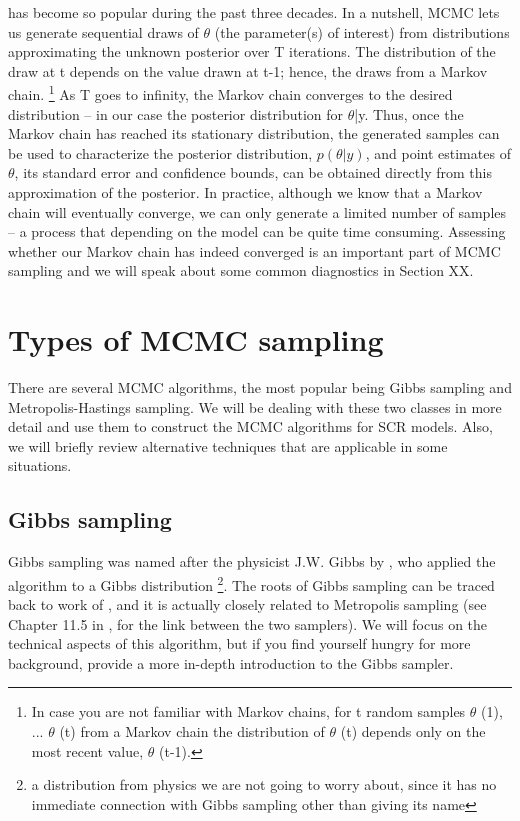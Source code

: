 has become so popular during the past three decades.
In a nutshell, MCMC lets us generate sequential draws of $\theta$ (the
parameter(s) of interest) from distributions approximating the unknown
posterior over T iterations. The distribution of the draw at t depends
on the value drawn at t-1; hence, the draws from a Markov
chain. \footnote{In case you are not familiar with Markov chains, for
  t random samples $\theta$ (1), ... $\theta$ (t) from a Markov chain
  the distribution of $\theta$ (t) depends only on the most recent
  value, $\theta$ (t-1).} As T goes to infinity, the Markov chain
converges to the desired distribution – in our case the posterior
distribution for $\theta$|y. Thus, once the Markov chain has reached
its stationary distribution, the generated samples can be used to
characterize the posterior distribution, $p(\theta|y)$, and point
estimates of $\theta$, its standard error and confidence bounds, can
be obtained directly from this approximation of the posterior. In
practice, although we know that a Markov chain will eventually
converge, we can only generate a limited number of samples – a process
that depending on the model can be quite time consuming. Assessing
whether our Markov chain has indeed converged is an important part of
MCMC sampling and we will speak about some common diagnostics in
Section XX.



\section{Types of MCMC sampling}

There are several MCMC algorithms, the most popular being Gibbs
sampling and Metropolis-Hastings sampling. We will be dealing with
these two classes in more detail and use them to construct the MCMC
algorithms for SCR models. Also, we will briefly review alternative
techniques that are applicable in some situations.


\subsection{Gibbs sampling}

Gibbs sampling was named after the physicist J.W. Gibbs by
\citet{geman_geman:1984}, who applied the algorithm to a Gibbs
distribution \footnote{a distribution from physics we are not going to
  worry about, since it has no immediate connection with Gibbs
  sampling other than giving its name}. The roots of Gibbs sampling
can be traced back to work of \citet{metropolis_ulam:1953}, and it is
actually closely related to Metropolis sampling (see Chapter 11.5 in
\citet{gelman_etal:2004}, for the link between the two samplers). We
will focus on the technical aspects of this algorithm, but if you find
yourself hungry for more background, \citet{casella_george:1992}
provide a more in-depth introduction to the Gibbs sampler.


